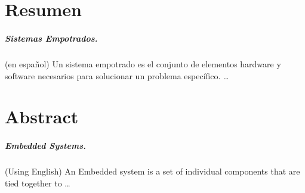 \pagestyle{plain}
\cleardoublepage
\chapter*{Resumen}
\bigskip
\paragraph{Sistemas Empotrados.}
(en español)
Un sistema empotrado es el conjunto de elementos hardware y software necesarios para solucionar un problema específico.  \ldots

\bigskip
\bigskip
\chapter*{Abstract}
\bigskip
\paragraph{Embedded Systems.}
(Using English)
An Embedded system is a set of individual components that are tied together to \ldots
